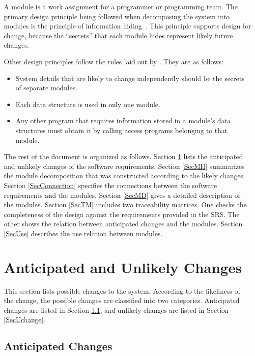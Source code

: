 \documentclass[12pt, titlepage]{article}
\begin{document}
A module is a work assignment for a programmer or programming team\citep{ParnasEtAl1984}. The primary design principle being followed when decomposing the system into modules is the principle of information hiding~\citep{Parnas1972a}. This principle supports design for change, because the ``secrets'' that each module hides represent likely future changes.

Other design principles follow the rules laid out by \citet{ParnasEtAl1984}. They are as follows:
\begin{itemize}
\item System details that are likely to change independently should be the
  secrets of separate modules.
\item Each data structure is used in only one module.
\item Any other program that requires information stored in a module's data
  structures must obtain it by calling access programs belonging to that module.
\end{itemize}

The rest of the document is organized as follows. Section
\ref{SecChange} lists the anticipated and unlikely changes of the software
requirements. Section \ref{SecMH} summarizes the module decomposition that
was constructed according to the likely changes. Section \ref{SecConnection}
specifies the connections between the software requirements and the
modules. Section \ref{SecMD} gives a detailed description of the
modules. Section \ref{SecTM} includes two traceability matrices. One checks
the completeness of the design against the requirements provided in the SRS. The
other shows the relation between anticipated changes and the modules. Section
\ref{SecUse} describes the use relation between modules.

\section{Anticipated and Unlikely Changes} \label{SecChange}

This section lists possible changes to the system. According to the likeliness
of the change, the possible changes are classified into two
categories. Anticipated changes are listed in Section \ref{SecAchange}, and
unlikely changes are listed in Section \ref{SecUchange}.

\subsection{Anticipated Changes} \label{SecAchange}
\end{document}
